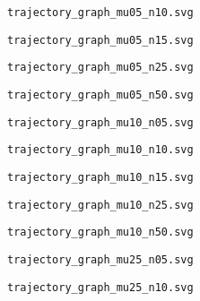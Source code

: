 \documentclass{article}
\begin{document}
\newpage
\verb|trajectory_graph_mu05_n10.svg|
\begin{figure}[t]
\centering

\vskip-8pt
\end{figure}
\newpage
\verb|trajectory_graph_mu05_n15.svg|
\begin{figure}[t]
\centering

\vskip-8pt
\end{figure}
\newpage
\verb|trajectory_graph_mu05_n25.svg|
\begin{figure}[t]
\centering

\vskip-8pt
\end{figure}
\newpage
\verb|trajectory_graph_mu05_n50.svg|
\begin{figure}[t]
\centering

\vskip-8pt
\end{figure}
\newpage
\verb|trajectory_graph_mu10_n05.svg|
\begin{figure}[t]
\centering

\vskip-8pt
\end{figure}
\newpage
\verb|trajectory_graph_mu10_n10.svg|
\begin{figure}[t]
\centering

\vskip-8pt
\end{figure}
\newpage
\verb|trajectory_graph_mu10_n15.svg|
\begin{figure}[t]
\centering

\vskip-8pt
\end{figure}
\newpage
\verb|trajectory_graph_mu10_n25.svg|
\begin{figure}[t]
\centering

\vskip-8pt
\end{figure}
\newpage
\verb|trajectory_graph_mu10_n50.svg|
\begin{figure}[t]
\centering

\vskip-8pt
\end{figure}
\newpage
\verb|trajectory_graph_mu25_n05.svg|
\begin{figure}[t]
\centering

\vskip-8pt
\end{figure}
\newpage
\verb|trajectory_graph_mu25_n10.svg|
\end{document}
